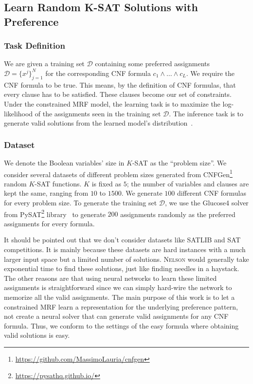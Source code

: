 \documentclass[letterpaper]{article} %
\newcommand{\nls}{\textsc{Nelson}\xspace}
\begin{document}
\subsection{Learn Random K-SAT Solutions with Preference}
\subsubsection{Task Definition}  We are given a training set $\mathcal{D}$ containing some preferred assignments $\mathcal{D}=\{x^j\}_{j=1}^N$ for the corresponding CNF formula $c_1\wedge\ldots\wedge  c_L$. We require the CNF formula to be true. This means, by the definition of CNF formulas, that every clause has to be satisfied. These clauses become our set of constraints. Under the constrained MRF model, the learning task is to maximize the log-likelihood of the assignments seen in the training set $\mathcal{D}$. The inference task is to generate valid solutions from  the learned model's distribution~\cite{DBLP:conf/aiia/DodaroP19,DBLP:conf/sac/RosaGO11}.

%

\subsubsection{Dataset} We denote the Boolean variables' size in $K$-SAT as the ``problem size''. We consider several datasets of different problem sizes generated from CNFGen\footnote{\url{https://github.com/MassimoLauria/cnfgen}}~\cite{DBLP:conf/sat/LauriaENV17} random $K$-SAT functions. $K$ is fixed as $5$; the number of variables and clauses are kept the same,  ranging from $10$ to $1500$. We generate $100$ different CNF formulas  for every problem size. To generate the training set $\mathcal{D}$, we use the Glucose4 solver from PySAT\footnote{\url{https://pysathq.github.io/}} library~\cite{DBLP:conf/sat/IgnatievMM18} to generate $200$ assignments randomly as the preferred assignments for every formula. 

It should be pointed out that we don't consider datasets like SATLIB and SAT competitions. It is mainly because these datasets are hard instances with a much larger input space but a limited number of solutions. \nls would generally take exponential time to find these solutions, just like finding needles in a haystack. The other reasons are that using neural networks to learn these limited assignments is straightforward since we can simply hard-wire the network to memorize all the valid assignments. The main purpose of this work is to let a constrained MRF learn a representation for the underlying preference pattern, not create a neural solver that can generate valid assignments for any CNF formula. Thus, we conform to the settings of the easy formula where obtaining valid solutions is easy.
\end{document}
